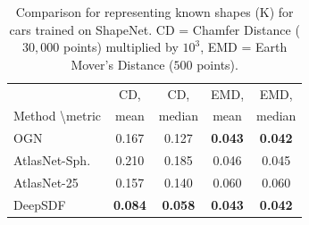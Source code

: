 \begin{table}[t]
\centering
\footnotesize
 \begin{tabular}{|l|c|c|c|c|}
 \hline
                                                  &   CD,    & CD,      & EMD,  & EMD, \\
  Method \textbackslash metric &   mean & median &  mean & median\\
 \hhline{|=|=|=|=|=|}
 OGN            & 0.167  & 0.127 & \bf{0.043} & \bf{0.042} \\
 AtlasNet-Sph.  &  0.210 & 0.185 & 0.046 & 0.045  \\
 AtlasNet-25    & 0.157 & 0.140 & 0.060 & 0.060   \\
 DeepSDF        & \bf{0.084} & \bf{0.058} & \bf{0.043} & \bf{0.042}  \\
 \hline
   \end{tabular}
   \caption{Comparison for representing known shapes (K) for cars trained on ShapeNet. CD = Chamfer Distance ($30,000$ points) multiplied by $10^3$, EMD = Earth Mover's Distance ($500$ points).} %
   \label{tab:2}
\end{table}